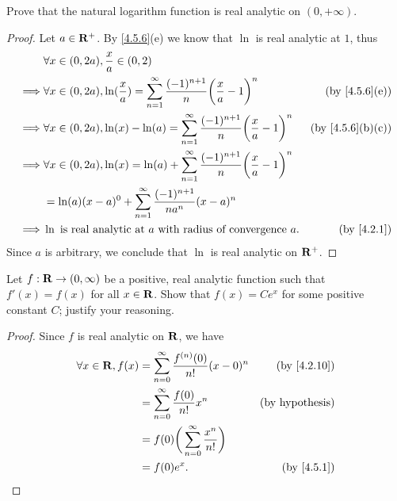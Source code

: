 \begin{exercise}\label{ex 4.5.6}
  Prove that the natural logarithm function is real analytic on \((0, +\infty)\).
\end{exercise}

\begin{proof}
  Let \(a \in \mathbf{R}^+\).
  By \cref{4.5.6}(e) we know that \(\ln\) is real analytic at \(1\), thus
  \begin{align*}
             & \forall x \in (0, 2a), \frac{x}{a} \in (0, 2)                                                                                                       \\
    \implies & \forall x \in (0, 2a), \ln(\frac{x}{a}) = \sum_{n = 1}^\infty \frac{(-1)^{n + 1}}{n} \bigg(\frac{x}{a} - 1\bigg)^n & \text{(by \cref{4.5.6}(e))}    \\
    \implies & \forall x \in (0, 2a), \ln(x) - \ln(a) = \sum_{n = 1}^\infty \frac{(-1)^{n + 1}}{n} \bigg(\frac{x}{a} - 1\bigg)^n  & \text{(by \cref{4.5.6}(b)(c))} \\
    \implies & \forall x \in (0, 2a), \ln(x) = \ln(a) + \sum_{n = 1}^\infty \frac{(-1)^{n + 1}}{n} \bigg(\frac{x}{a} - 1\bigg)^n                                   \\
             & = \ln(a) (x - a)^0 + \sum_{n = 1}^\infty \frac{(-1)^{n + 1}}{n a^n} (x - a)^n                                                                       \\
    \implies & \ln \text{ is real analytic at } a \text{ with radius of convergence } a.                                          & \text{(by \cref{4.2.1})}
  \end{align*}
  Since \(a\) is arbitrary, we conclude that \(\ln\) is real analytic on \(\mathbf{R}^+\).
\end{proof}

\begin{exercise}\label{ex 4.5.7}
  Let \(f : \mathbf{R} \to (0, \infty)\) be a positive, real analytic function such that \(f'(x) = f(x)\) for all \(x \in \mathbf{R}\).
  Show that \(f(x) = C e^x\) for some positive constant \(C\);
  justify your reasoning.
\end{exercise}

\begin{proof}
  Since \(f\) is real analytic on \(\mathbf{R}\), we have
  \begin{align*}
    \forall x \in \R, f(x) & = \sum_{n = 0}^\infty \frac{f^{(n)}(0)}{n!} (x - 0)^n & \text{(by \cref{4.2.10})} \\
                           & = \sum_{n = 0}^\infty \frac{f(0)}{n!} x^n             & \text{(by hypothesis)}    \\
                           & = f(0) \bigg(\sum_{n = 0}^\infty \frac{x^n}{n!}\bigg)                             \\
                           & = f(0) e^x.                                           & \text{(by \cref{4.5.1})}
  \end{align*}
\end{proof}

